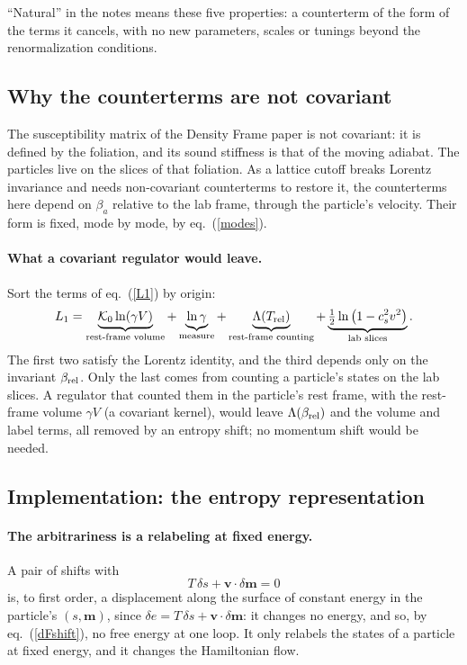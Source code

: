 \documentclass[11pt,aps,preprint,nofootinbib,superscriptaddress,tightenlines]{revtex4-2}
\def\st{\begin{equation}}
\def\stp{\end{equation}}
\def\Eq#1{eq.~(\ref{#1})}
\let\oldparagraph\paragraph
\renewcommand{\paragraph}{\par\bigskip\oldparagraph}
\begin{document}
``Natural'' in the notes means these five properties: a counterterm of the form of the terms it cancels, with no new parameters, scales or tunings beyond the
renormalization conditions.

\subsection{Why the counterterms are not covariant}

The susceptibility matrix of the Density Frame paper is not covariant: it is defined by the foliation, and its sound stiffness is that of the moving adiabat.  The
particles live on the slices of that foliation.  As a lattice cutoff breaks Lorentz invariance and needs non-covariant counterterms to restore it, the counterterms
here depend on $\beta_a$ relative to the lab frame, through the particle's velocity.  Their form is fixed, mode by mode, by \Eq{modes}.

\paragraph{What a covariant regulator would leave.}  Sort the terms of \Eq{L1} by origin:
\st
L_1=\underbrace{\mathcal K_0\ln(\gamma V)}_{\text{rest-frame volume}}+\underbrace{\ln\gamma}_{\text{measure}}+\underbrace{\Lambda(T_{\rm rel})}_{\text{rest-frame counting}}
+\underbrace{\tfrac12\ln\big(1-c_s^2v^2\big)}_{\text{lab slices}} .
\stp
The first two satisfy the Lorentz identity, and the third depends only on the invariant $\beta_{\rm rel}$.  Only the last comes from counting a particle's states on the lab
slices.  A regulator that counted them in the particle's rest frame, with the rest-frame volume $\gamma V$ (a covariant kernel), would leave $\Lambda(\beta_{\rm rel})$ and the
volume and label terms, all removed by an entropy shift; no momentum shift would be needed.

\subsection{Implementation: the entropy representation}
\label{sec:implementation}

\paragraph{The arbitrariness is a relabeling at fixed energy.}  A pair of shifts with
\st
T\,\delta s+\bm v\cdot\delta\bm m=0
\stp
is, to first order, a displacement along the surface of constant energy in the particle's $(s,\bm m)$, since $\delta e=T\,\delta s+\bm v\cdot\delta\bm m$: it changes no
energy, and so, by \Eq{dFshift}, no free energy at one loop.  It only relabels the states of a particle at fixed energy, and it changes the Hamiltonian flow.
\end{document}
